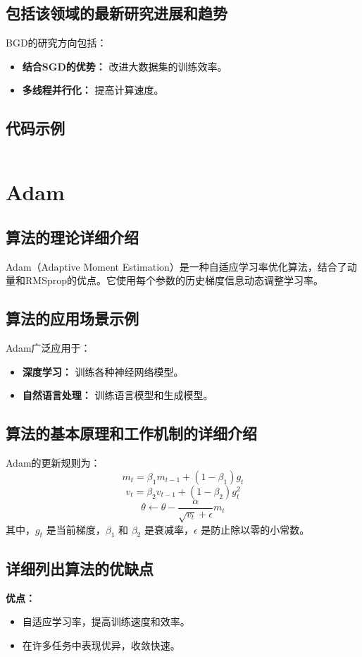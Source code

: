 \subsection*{包括该领域的最新研究进展和趋势}
BGD的研究方向包括：
\begin{itemize}
    \item \textbf{结合SGD的优势：} 改进大数据集的训练效率。
    \item \textbf{多线程并行化：} 提高计算速度。
\end{itemize}
\subsection*{代码示例}
\begin{lstlisting}

\end{lstlisting}


\section{Adam}
\subsection*{算法的理论详细介绍}
Adam（Adaptive Moment Estimation）是一种自适应学习率优化算法，结合了动量和RMSprop的优点。它使用每个参数的历史梯度信息动态调整学习率。

\subsection*{算法的应用场景示例}
Adam广泛应用于：
\begin{itemize}
    \item \textbf{深度学习：} 训练各种神经网络模型。
    \item \textbf{自然语言处理：} 训练语言模型和生成模型。
\end{itemize}

\subsection*{算法的基本原理和工作机制的详细介绍}
Adam的更新规则为：
\[
    m_t = \beta_1 m_{t-1} + (1 - \beta_1) g_t
\]
\[
    v_t = \beta_2 v_{t-1} + (1 - \beta_2) g_t^2
\]
\[
    \theta \leftarrow \theta - \frac{\alpha}{\sqrt{v_t} + \epsilon} m_t
\]
其中，\(g_t\) 是当前梯度，\(\beta_1\) 和 \(\beta_2\) 是衰减率，\(\epsilon\) 是防止除以零的小常数。

\subsection*{详细列出算法的优缺点}
\textbf{优点：}
\begin{itemize}
    \item 自适应学习率，提高训练速度和效率。
    \item 在许多任务中表现优异，收敛快速。
\end{itemize}

